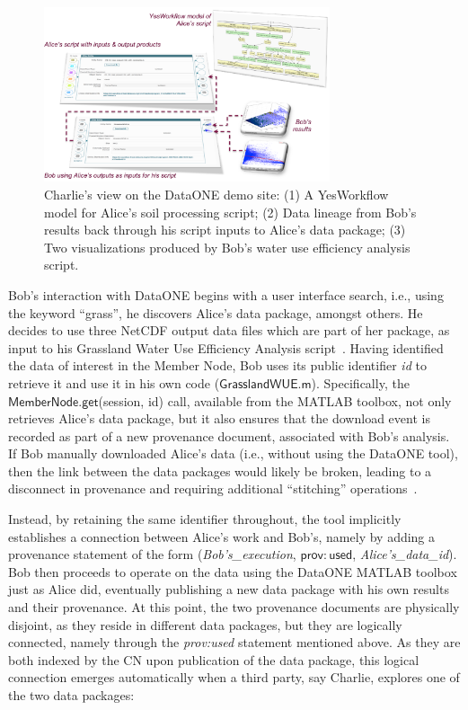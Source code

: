 \documentclass[a4paper]{llncs}
\newcommand{\code}[1]{\ensuremath{\mathsf{#1}}}
\begin{document}
\begin{figure}[h]
\centering   
\includegraphics[width=0.75\textwidth]{figs/abc-crop}
\caption{Charlie's view on the DataONE demo site: (1) A YesWorkflow model for Alice's soil processing script; (2) Data lineage from Bob's results back through his script inputs to Alice's data package; (3) Two visualizations produced by Bob's water use efficiency analysis script.}
\label{fig2}
\end{figure}


Bob's interaction with DataONE begins with a user interface search, i.e., using the keyword ``grass'', he discovers Alice's data package, amongst others.  He decides to use three NetCDF output data files which are part of her package, as input to his Grassland Water Use Efficiency Analysis script~\cite{MsTMIP-model-output-data-set}.  Having identified the data of interest in the Member Node, Bob uses its public identifier \textit{id} to retrieve it and use it in his own code (\code{GrasslandWUE.m}).  Specifically, the \code{MemberNode.get}(session, id) call, available from the MATLAB toolbox, not only retrieves Alice's data package, but it also ensures that the download event is recorded as part of a new provenance document, associated with Bob's analysis.
%
If Bob manually downloaded Alice's data (i.e., without using the DataONE tool), then the link between the data packages would likely be broken, leading to a disconnect in provenance and requiring additional ``stitching'' operations~\cite{missing-link}.

Instead, by retaining the same identifier throughout, the tool implicitly establishes a connection between Alice's work and Bob's, namely by adding a provenance statement of the form (\emph{{Bob's\_execution}}, \code{prov{:}used}, {\emph{Alice's\_data\_id}}). Bob then proceeds to operate on the data using the DataONE MATLAB toolbox just as Alice did, eventually publishing a new data package with his own results and their provenance.  At this point, the two provenance documents are physically disjoint, as they reside in different data packages, but they are logically connected, namely through the \emph{prov:used} statement mentioned above.  As they are both indexed by the CN upon publication of the data package, this logical connection emerges automatically when a third party, say Charlie, explores one of the two data packages:
\end{document}
